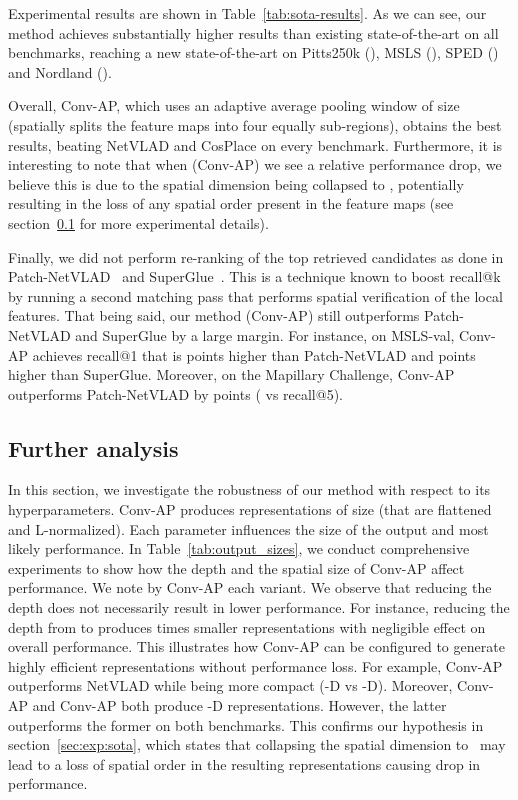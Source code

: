 \documentclass{article}
\begin{document}
Experimental results are shown in Table~\ref{tab:sota-results}. As we can see, our method achieves substantially higher results than existing state-of-the-art on all benchmarks, reaching a new state-of-the-art on Pitts250k (), MSLS (), SPED () and Nordland ().

Overall, Conv-AP, which uses an adaptive average pooling window of size  (spatially splits the feature maps into four equally sub-regions), obtains the best results, beating NetVLAD and CosPlace on every benchmark. Furthermore, it is interesting to note that when  (Conv-AP) we see a relative performance drop, we believe this is due to the spatial dimension being collapsed to , potentially resulting in the loss of any spatial order present in the feature maps (see section~\ref{sec:exp:extended} for more experimental details).

Finally, we did not perform re-ranking of the top retrieved candidates as done in Patch-NetVLAD~\cite{hausler2021patch} and SuperGlue~\cite{sarlin2020superglue}. This is a technique known to boost recall@k by running a second matching pass that performs spatial verification of the local features. That being said, our method (Conv-AP) still outperforms Patch-NetVLAD and SuperGlue by a large margin. For instance, on MSLS-val, Conv-AP achieves recall@1 that is  points higher than Patch-NetVLAD and  points higher than SuperGlue. Moreover, on the Mapillary Challenge, Conv-AP outperforms Patch-NetVLAD by  points ( vs  recall@5).



\subsection{Further analysis}\label{sec:exp:extended}
In this section, we investigate the robustness of our method with respect to its hyperparameters. Conv-AP produces representations of size  (that are flattened and L-normalized). Each parameter influences the size of the output and most likely performance. In Table~\ref{tab:output_sizes}, we conduct comprehensive experiments to show how the depth  and the spatial size  of Conv-AP affect performance. We note by Conv-AP each variant. 
We observe that reducing the depth  does not necessarily result in lower performance. For instance, reducing the depth from  to  produces  times smaller representations with negligible effect on overall performance. This illustrates how Conv-AP can be configured to generate highly efficient representations without performance loss. For example, \mbox{Conv-AP} outperforms NetVLAD while being  more compact (-D vs -D). 
Moreover, \mbox{Conv-AP} and Conv-AP both produce -D representations. However, the latter outperforms the former on both benchmarks. This confirms our hypothesis in section~\ref{sec:exp:sota}, which states that collapsing the spatial dimension to~ may lead to a loss of spatial order in the resulting representations causing drop in performance.
\end{document}
